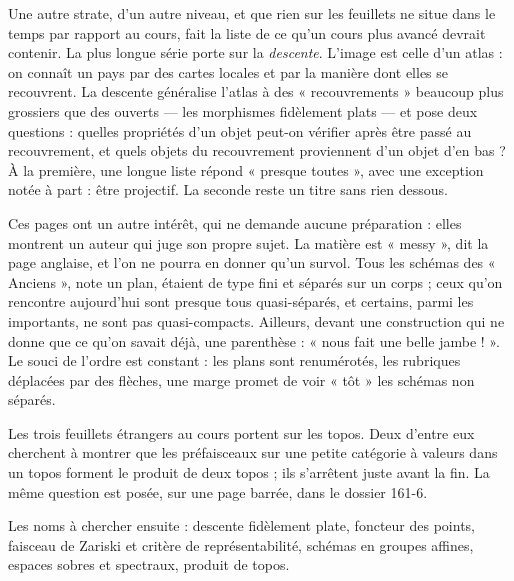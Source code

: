 \documentclass[11pt,a4paper]{article}
\begin{document}
\begin{resume}
Une autre strate, d'un autre niveau, et que rien sur les feuillets ne situe
dans le temps par rapport au cours, fait la liste de ce qu'un cours plus avancé devrait contenir. La plus longue série
porte sur la \emph{descente}. L'image est celle d'un atlas : on connaît un pays
par des cartes locales et par la manière dont elles se recouvrent. La descente
généralise l'atlas à des « recouvrements » beaucoup plus grossiers que des
ouverts --- les morphismes fidèlement plats --- et pose deux questions : quelles
propriétés d'un objet peut-on vérifier après être passé au recouvrement, et
quels objets du recouvrement proviennent d'un objet d'en bas ? À la première,
une longue liste répond « presque toutes », avec une exception notée à part :
être projectif. La seconde reste un titre sans rien dessous.

Ces pages ont un autre intérêt, qui ne demande aucune préparation : elles
montrent un auteur qui juge son propre sujet. La matière est « messy », dit la
page anglaise, et l'on ne pourra en donner qu'un survol. Tous les schémas des
« Anciens », note un plan, étaient de type fini et séparés sur un corps ; ceux
qu'on rencontre aujourd'hui sont presque tous quasi-séparés, et certains, parmi
les importants, ne sont pas quasi-compacts. Ailleurs, devant une construction
qui ne donne que ce qu'on savait déjà, une parenthèse : « nous fait une belle
jambe ! ». Le souci de l'ordre est constant : les plans sont renumérotés,
les rubriques déplacées par des flèches, une marge promet de voir « tôt » les
schémas non séparés.

Les trois feuillets étrangers au cours portent sur les topos. Deux d'entre eux
cherchent à montrer que les préfaisceaux sur une petite catégorie à valeurs
dans un topos forment le produit de deux topos ; ils s'arrêtent juste avant la
fin. La même question est posée, sur une page barrée, dans le dossier 161-6.

Les noms à chercher ensuite : descente fidèlement plate, foncteur des points,
faisceau de Zariski et critère de représentabilité, schémas en groupes affines,
espaces sobres et spectraux, produit de topos.

\end{resume}
\end{document}
